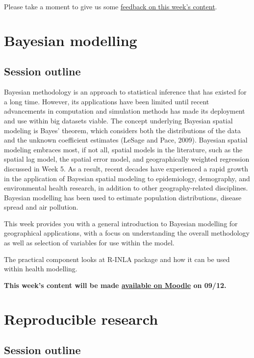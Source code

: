\documentclass[
]{book}
\begin{document}
Please take a moment to give us some \href{https://forms.gle/BYbZySVSHeoUEkJh9}{feedback on this week's content}.

\hypertarget{bayesian-modelling}{%
\chapter{Bayesian modelling}\label{bayesian-modelling}}

\hypertarget{session-outline}{%
\section{Session outline}\label{session-outline}}

Bayesian methodology is an approach to statistical inference that has existed for a long time. However, its applications have been limited until recent advancements in computation and simulation methods has made its deployment and use within big datasets viable. The concept underlying Bayesian spatial modeling is Bayes' theorem, which considers both the distributions of the data and the unknown coefficient estimates (LeSage and Pace, 2009). Bayesian spatial modeling embraces most, if not all, spatial models in the literature, such as the spatial lag model, the spatial error model, and geographically weighted regression discussed in Week 5. As a result, recent decades have experienced a rapid growth in the application of Bayesian spatial modeling to epidemiology, demography, and environmental health research, in addition to other geography-related disciplines. Bayesian modelling has been used to estimate population distributions, disease spread and air pollution.

This week provides you with a general introduction to Bayesian modelling for geographical applications, with a focus on understanding the overall methodology as well as selection of variables for use within the model.

The practical component looks at R-INLA package and how it can be used within health modelling.

\textbf{This week's content will be made \href{https://moodle.ucl.ac.uk/}{available on Moodle} on 09/12.}

\hypertarget{reproducible-research}{%
\chapter{Reproducible research}\label{reproducible-research}}

\hypertarget{session-outline}{%
\section{Session outline}\label{session-outline}}
\end{document}
